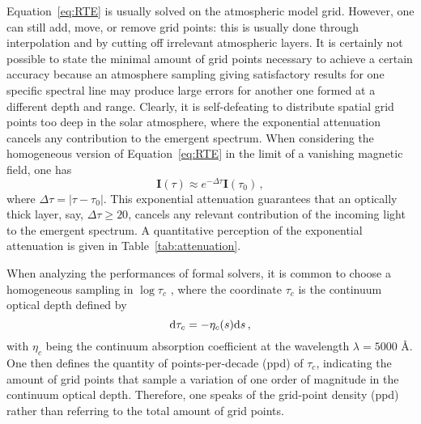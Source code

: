 \documentclass[iop,numberedappendix,twocolappendix,twocolumn]{emulateapj}
\begin{document}
Equation~\eqref{eq:RTE} is usually solved on the atmospheric model grid.
However, one can still add, move, or remove grid points: this is usually done through interpolation and by cutting off irrelevant atmospheric layers.
It is certainly not possible to state the minimal amount of grid points necessary to achieve a certain accuracy
because an atmosphere sampling giving satisfactory results for one specific spectral line may produce large errors for another one formed at a different depth and range.
Clearly, it is self-defeating to distribute spatial grid points too deep in the solar atmosphere, 
where the exponential attenuation cancels any contribution to the emergent spectrum. 
When considering the homogeneous version of Equation~\eqref{eq:RTE} in the limit of a vanishing magnetic field, one has
%
\begin{equation*}
\mathbf I(\tau)\approx e^{-\Delta\tau}\mathbf I(\tau_0)\,,
\label{exp_att}
\end{equation*}
%
where $\Delta\tau=|\tau-\tau_0|$. This exponential attenuation guarantees that an optically thick layer, say, $\Delta\tau\ge20$,
cancels any relevant contribution of the incoming light to the emergent spectrum. 
A quantitative perception of the exponential attenuation is given in Table~\ref{tab:attenuation}.

When analyzing the performances of formal solvers, it is common to choose a homogeneous sampling in $\log\tau_c$ \citep[e.g.,][]{rees+al1989,bellot_rubio+al1998,delacruz_rodriguez+piskunov2013}, where the coordinate $\tau_c$ is the continuum optical depth defined by
%
\begin{equation*}
{\rm d}\tau_c=-\eta_c(s){\rm d}s\,,
\label{opt_depth}
\end{equation*}
%
with $\eta_c$ being the continuum absorption coefficient at the wavelength $\lambda=5000$ {\rm \AA}.
One then defines the quantity of points-per-decade (ppd) of $\tau_c$, indicating the amount of grid points that sample a variation of one order of magnitude in the continuum optical depth.
Therefore, one speaks of the grid-point density (ppd) rather  than referring to the total amount of grid points.
\end{document}
